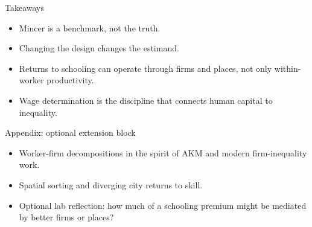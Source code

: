 \documentclass[aspectratio=169,11pt]{beamer}
\begin{document}
\begin{frame}{Takeaways}
\begin{itemize}
    \item Mincer is a benchmark, not the truth.
    \item Changing the design changes the estimand.
    \item Returns to schooling can operate through firms and places, not only within-worker productivity.
    \item Wage determination is the discipline that connects human capital to inequality.
\end{itemize}
\end{frame}

\appendix

\begin{frame}{Appendix: optional extension block}
\begin{itemize}
    \item Worker-firm decompositions in the spirit of AKM and modern firm-inequality work.
    \item Spatial sorting and diverging city returns to skill.
    \item Optional lab reflection: how much of a schooling premium might be mediated by better firms or places?
\end{itemize}
\end{frame}
\end{document}
